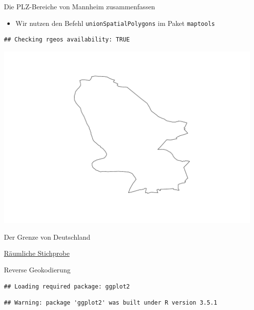 \documentclass[ignorenonframetext,]{beamer}
\providecommand{\tightlist}{%
  \setlength{\itemsep}{0pt}\setlength{\parskip}{0pt}}
\begin{document}
\begin{frame}[fragile]{Die PLZ-Bereiche von Mannheim zusammenfassen}
\protect\hypertarget{die-plz-bereiche-von-mannheim-zusammenfassen}{}

\begin{itemize}
\tightlist
\item
  Wir nutzen den Befehl \texttt{unionSpatialPolygons} im Paket
  \texttt{maptools}
\end{itemize}

\begin{verbatim}
## Checking rgeos availability: TRUE
\end{verbatim}

\includegraphics{Shapefiles_files/figure-beamer/unnamed-chunk-13-1.pdf}

\end{frame}

\begin{frame}{Der Grenze von Deutschland}
\protect\hypertarget{der-grenze-von-deutschland}{}

\end{frame}

\begin{frame}{\href{https://www.rdocumentation.org/packages/sp/versions/1.3-1/topics/spsample}{Räumliche
Stichprobe}}
\protect\hypertarget{raumliche-stichprobe}{}

\end{frame}

\begin{frame}[fragile]{Reverse Geokodierung}
\protect\hypertarget{reverse-geokodierung}{}

\begin{verbatim}
## Loading required package: ggplot2
\end{verbatim}

\begin{verbatim}
## Warning: package 'ggplot2' was built under R version 3.5.1
\end{verbatim}

\end{frame}
\end{document}
